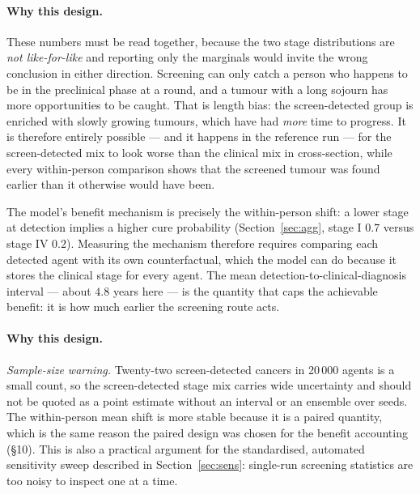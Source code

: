 \documentclass[12pt,a4paper]{article}
\newcommand{\why}[1]{\paragraph{Why this design.} #1}
\begin{document}
\why{These numbers must be read together, because the two stage distributions are \emph{not like-for-like}
and reporting only the marginals would invite the wrong conclusion in either direction. Screening can only
catch a person who happens to be in the preclinical phase at a round, and a tumour with a long sojourn has
more opportunities to be caught. That is length bias: the screen-detected group is enriched with
slowly growing tumours, which have had \emph{more} time to progress. It is therefore entirely possible ---
and it happens in the reference run --- for the screen-detected mix to look worse than the clinical mix in
cross-section, while every within-person comparison shows that the screened tumour was found earlier than
it otherwise would have been.

The model's benefit mechanism is precisely the within-person shift: a lower stage at detection implies a
higher cure probability (Section~\ref{sec:agg}, stage I $0.7$ versus stage IV $0.2$). Measuring the
mechanism therefore requires comparing each detected agent with its own counterfactual, which the model can
do because it stores the clinical stage for every agent. The mean detection-to-clinical-diagnosis interval
--- about $4.8$ years here --- is the quantity that caps the achievable benefit: it is how much earlier the
screening route acts.}

\why{\emph{Sample-size warning.} Twenty-two screen-detected cancers in 20\,000 agents is a small count, so
the screen-detected stage mix carries wide uncertainty and should not be quoted as a point estimate without
an interval or an ensemble over seeds. The within-person mean shift is more stable because it is a paired
quantity, which is the same reason the paired design was chosen for the benefit accounting (\S10). This is
also a practical argument for the standardised, automated sensitivity sweep described in
Section~\ref{sec:sens}: single-run screening statistics are too noisy to inspect one at a time.}
\end{document}
